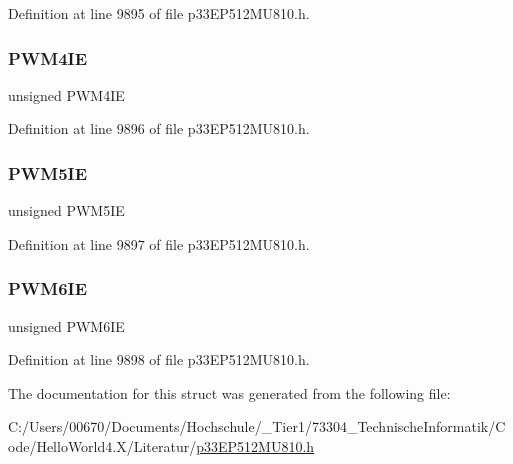 Definition at line 9895 of file p33\+E\+P512\+M\+U810.\+h.

\mbox{\label{structtag_i_e_c6_b_i_t_s_aefa6ab25aa514189774d5fbe0be2e21e}} 
\subsubsection{\texorpdfstring{P\+W\+M4\+IE}{PWM4IE}}
{\footnotesize\ttfamily unsigned P\+W\+M4\+IE}



Definition at line 9896 of file p33\+E\+P512\+M\+U810.\+h.

\mbox{\label{structtag_i_e_c6_b_i_t_s_a21048c2f97ebf6173864fbf4a07c7419}} 
\subsubsection{\texorpdfstring{P\+W\+M5\+IE}{PWM5IE}}
{\footnotesize\ttfamily unsigned P\+W\+M5\+IE}



Definition at line 9897 of file p33\+E\+P512\+M\+U810.\+h.

\mbox{\label{structtag_i_e_c6_b_i_t_s_a68eb3f044332ba68161c3732e156618b}} 
\subsubsection{\texorpdfstring{P\+W\+M6\+IE}{PWM6IE}}
{\footnotesize\ttfamily unsigned P\+W\+M6\+IE}



Definition at line 9898 of file p33\+E\+P512\+M\+U810.\+h.



The documentation for this struct was generated from the following file\+:\begin{DoxyCompactItemize}
\item 
C\+:/\+Users/00670/\+Documents/\+Hochschule/\+\_\+\+Tier1/73304\+\_\+\+Technische\+Informatik/\+Code/\+Hello\+World4.\+X/\+Literatur/\hyperlink{p33_e_p512_m_u810_8h}{p33\+E\+P512\+M\+U810.\+h}\end{DoxyCompactItemize}
